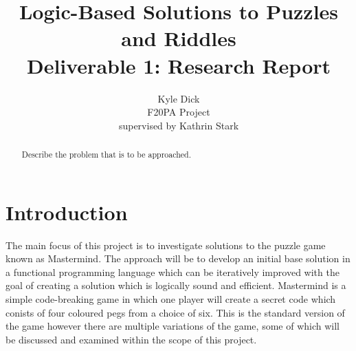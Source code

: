 \documentclass[12pt]{article}  %
\title{Logic-Based Solutions to Puzzles and Riddles\\
Deliverable 1: Research Report}
\author{Kyle Dick\\
F20PA Project\\
supervised by
Kathrin Stark}
\theoremstyle{definition}
\theoremstyle{remark}
\begin{document}
\maketitle

\newpage                     %
\begin{abstract}
Describe the problem that is to be approached.


\end{abstract}

\newpage                     %
\tableofcontents

\newpage                     %
\section{Introduction}\label{s:intro}
%
The main focus of this project is to investigate solutions to the puzzle game known as Mastermind. The approach will be to develop an initial base solution in a functional programming language which can be iteratively improved with the goal of creating a solution which is logically sound and efficient.
Mastermind is a simple code-breaking game in which one player will create a secret code which conists of four coloured pegs from a choice of six. This is the standard version of the game however there are multiple variations of the game, some of which will be discussed and examined within the scope of this project.
\end{document}

